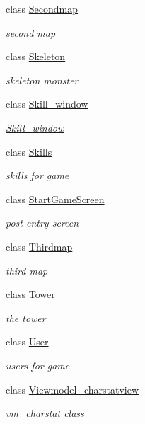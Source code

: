 \begin{DoxyCompactItemize}
class \hyperlink{class_lightdeath_1_1_secondmap}{Secondmap}
\begin{DoxyCompactList}\small\item\em second map \end{DoxyCompactList}\item 
class \hyperlink{class_lightdeath_1_1_skeleton}{Skeleton}
\begin{DoxyCompactList}\small\item\em skeleton monster \end{DoxyCompactList}\item 
class \hyperlink{class_lightdeath_1_1_skill__window}{Skill\+\_\+window}
\begin{DoxyCompactList}\small\item\em \hyperlink{class_lightdeath_1_1_skill__window}{Skill\+\_\+window} \end{DoxyCompactList}\item 
class \hyperlink{class_lightdeath_1_1_skills}{Skills}
\begin{DoxyCompactList}\small\item\em skills for game \end{DoxyCompactList}\item 
class \hyperlink{class_lightdeath_1_1_start_game_screen}{Start\+Game\+Screen}
\begin{DoxyCompactList}\small\item\em post entry screen \end{DoxyCompactList}\item 
class \hyperlink{class_lightdeath_1_1_thirdmap}{Thirdmap}
\begin{DoxyCompactList}\small\item\em third map \end{DoxyCompactList}\item 
class \hyperlink{class_lightdeath_1_1_tower}{Tower}
\begin{DoxyCompactList}\small\item\em the tower \end{DoxyCompactList}\item 
class \hyperlink{class_lightdeath_1_1_user}{User}
\begin{DoxyCompactList}\small\item\em users for game \end{DoxyCompactList}\item 
class \hyperlink{class_lightdeath_1_1_viewmodel__charstatview}{Viewmodel\+\_\+charstatview}
\begin{DoxyCompactList}\small\item\em vm\+\_\+charstat class \end{DoxyCompactList}\item 

\end{DoxyCompactItemize}
